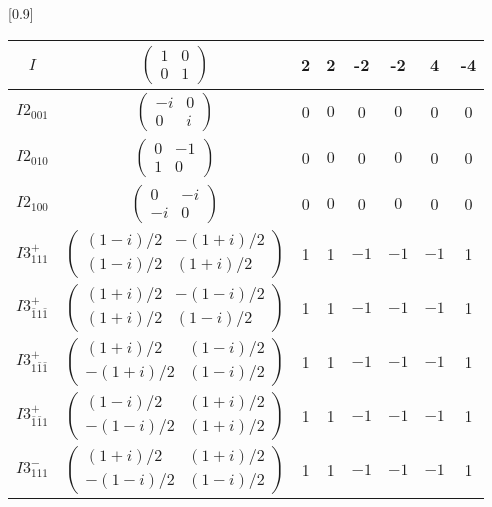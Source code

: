 \documentclass[3p,preprint]{elsarticle}
\begin{document}
\begin{table}[H]
	\scalebox{0.9}[0.9]{
		\begin{tabular}{|c|c||c|c|c|c|c|c|} \hline									
			$I$ & 				$\left(\begin{array}{cc} 1&0 \\ 0&1 \end{array}\right)$	& 2 &  2 &  -2 &  -2 &  4 &  -4 \\ \hline
			$I2_{001}$ &		$\left(\begin{array}{cc} -i&0 \\ 0&i \end{array}\right)$	& 0 & $0$ & 0 & $0$ & 0 & 0 \\ \hline
			$I2_{010}$ &		$\left(\begin{array}{cc} 0&-1 \\ 1&0 \end{array}\right)$	&0 & $0$ & 0 & $0$ & 0 & 0 \\ \hline
			$I2_{100}$ &		$\left(\begin{array}{cc} 0&-i \\ -i&0 \end{array}\right)$	& 0 & $0$ & 0 & $0$ & 0 & 0 \\ \hline
			$I3^{+}_{111}$ &		$\left(\begin{array}{cc} (1-i)/2&-(1+i)/2 \\ (1-i)/2&(1+i)/2 \end{array}\right)$	&1 & 1 & $-1$ & $-1$ & $-1$ & 1 \\ \hline
			$I3^{+}_{\bar{1}1\bar{1}}$ &		$\left(\begin{array}{cc} (1+i)/2&-(1-i)/2 \\ (1+i)/2&(1-i)/2 \end{array}\right)$	&1 & 1 & $-1$ & $-1$ & $-1$ & 1 \\ \hline
			$I3^{+}_{1\bar{1}\bar{1}}$ &		$\left(\begin{array}{cc} (1+i)/2&(1-i)/2 \\ -(1+i)/2&(1-i)/2 \end{array}\right)$	& 1 & 1 & $-1$ & $-1$ & $-1$ & 1 \\ \hline
			$I3^{+}_{\bar{1}\bar{1}1}$ &		$\left(\begin{array}{cc} (1-i)/2&(1+i)/2 \\ -(1-i)/2&(1+i)/2 \end{array}\right)$	&1 & 1 & $-1$ & $-1$ & $-1$ & 1 \\ \hline
			$I3^{-}_{111}$ &		$\left(\begin{array}{cc} (1+i)/2&(1+i)/2 \\ -(1-i)/2&(1-i)/2 \end{array}\right)$	&1 & 1 & $-1$ & $-1$ & $-1$ & 1 \\ \hline

\end{tabular}}
\end{table}
\end{document}
